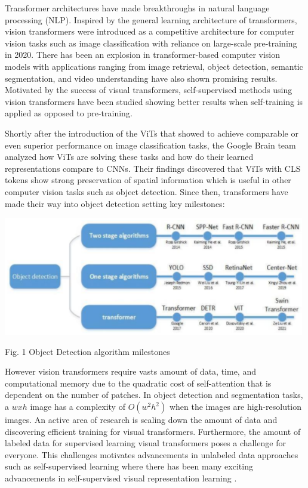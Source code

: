 \documentclass[10pt,twocolumn,letterpaper]{article}
\begin{document}
Transformer architectures\cite{vaswani2017attention} have made breakthroughs in natural language processing (NLP). Inspired by the general learning architecture of transformers, vision transformers were introduced as a competitive architecture for computer vision tasks such as image classification\cite{dosovitskiy2020image} with reliance on large-scale pre-training in 2020. There has been an explosion in transformer-based computer vision models with applications ranging from image retrieval\cite{el2021training}, object detection\cite{liu2021swin}, semantic segmentation\cite{wang2021pyramid}\cite{zhang2021multi}\cite{https://doi.org/10.48550/arxiv.2012.15840}, and video understanding\cite{https://doi.org/10.48550/arxiv.2103.15691}\cite{bertasius2021space}\cite{https://doi.org/10.48550/arxiv.2104.11227} have also shown promising results. Motivated by the success of visual transformers, self-supervised methods using vision transformers have been studied showing better results when self-training is applied as opposed to pre-training\cite{zoph2020rethinking}\cite{https://doi.org/10.48550/arxiv.2104.14294}.

Shortly after the introduction of the ViTs that showed to achieve comparable or even superior performance on image classification tasks, the Google Brain team analyzed how ViTs are solving these tasks and how do their learned representations compare to CNNs\cite{raghu2021vision}. Their findings discovered that ViTs with CLS tokens show strong preservation of spatial information which is useful in other computer vision tasks such as object detection. Since then, transformers have made their way into object detection setting key milestones\cite{arkin2021survey}:

\includegraphics[width=0.8\linewidth]{docs/latex/images/ObjectDetection.png}
\caption{Fig. 1 Object Detection algorithm milestones}

However vision transformers require vasts amount of data, time, and computational memory due to the quadratic cost of self-attention that is dependent on the number of patches. In object detection and segmentation tasks, a $wxh$ image has a complexity of $O(w^2h^2)$ when the images are high-resolution images. An active area of research is scaling down the amount of data and discovering efficient training for visual transformers\cite{liu2021efficient}\cite{lee2021vision}. Furthermore, the amount of labeled data for supervised learning visual transformers poses a challenge for everyone. This challenges motivates advancements in unlabeled data approaches such as self-supervised learning where there has been many exciting advancements in self-supervised visual representation learning  \cite{chen2020simple} \cite{he2020momentum} \cite{henaff2020dat} \cite{chen2020improved} \cite{caron2020unsupervised} \cite{grill2020bootstrap}.
\end{document}
